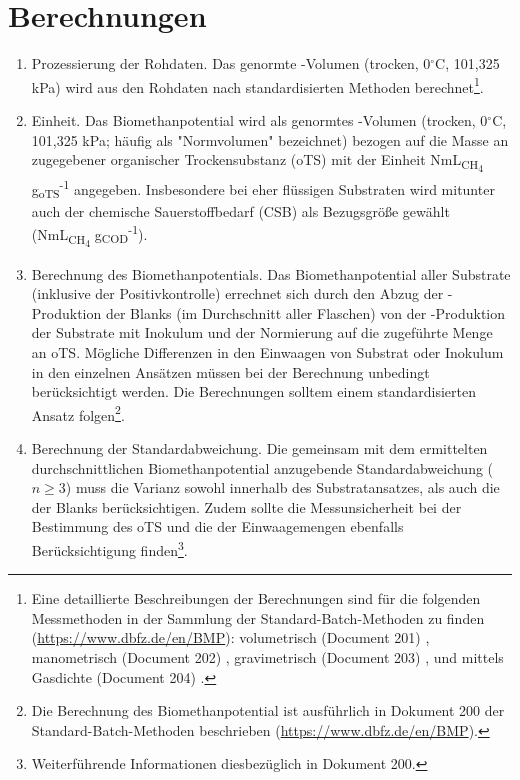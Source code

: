 \documentclass[]{article}
\begin{document}
\section{Berechnungen}
\label{sec:calculations}
\begin{enumerate}
  \item Prozessierung der Rohdaten.
    Das genormte -Volumen (trocken, 0$^\circ$C, 101,325 kPa) wird aus den Rohdaten nach standardisierten Methoden berechnet\footnote{
      Eine detaillierte Beschreibungen der Berechnungen sind für die folgenden Messmethoden in der Sammlung der Standard-Batch-Methoden zu finden (\url{https://www.dbfz.de/en/BMP}): volumetrisch (Document 201) \citep{BMPdoc201vol}, manometrisch (Document 202) \citep{BMPdoc202man}, gravimetrisch (Document 203) \citep{BMPdoc203grav}, und mittels Gasdichte (Document 204) \citep{BMPdoc204gasdens}.
    }.
  \item Einheit.
	  Das Biomethanpotential wird als genormtes -Volumen (trocken, 0$^\circ$C, 101,325 kPa; häufig als "Normvolumen" bezeichnet) bezogen auf die Masse an zugegebener organischer Trockensubstanz (oTS) mit der Einheit NmL\textsubscript{CH\textsubscript{4}} g\textsubscript{oTS}\textsuperscript{-1} angegeben. Insbesondere bei eher flüssigen Substraten wird mitunter auch der chemische Sauerstoffbedarf (CSB) als Bezugsgröße gewählt (NmL\textsubscript{CH\textsubscript{4}} g\textsubscript{COD}\textsuperscript{-1}).
  \item Berechnung des Biomethanpotentials.
    Das Biomethanpotential aller Substrate (inklusive der Positivkontrolle) errechnet sich durch den Abzug der -Produktion der Blanks (im Durchschnitt aller Flaschen) von der -Produktion der Substrate mit Inokulum und der Normierung auf die zugeführte Menge an oTS.
    Mögliche Differenzen in den Einwaagen von Substrat oder Inokulum in den einzelnen Ansätzen müssen bei der Berechnung unbedingt berücksichtigt werden.
    Die Berechnungen solltem einem standardisierten Ansatz folgen\footnote{
      Die Berechnung des Biomethanpotential ist ausführlich in Dokument 200 der Standard-Batch-Methoden beschrieben (\url{https://www.dbfz.de/en/BMP}).
    }.
  \item Berechnung der Standardabweichung.
    Die gemeinsam mit dem ermittelten durchschnittlichen Biomethanpotential anzugebende Standardabweichung ($n \ge 3$) muss die Varianz sowohl innerhalb des Substratansatzes, als auch die der Blanks berücksichtigen. Zudem sollte die Messunsicherheit bei der Bestimmung des oTS und die der Einwaagemengen ebenfalls Berücksichtigung finden\footnote{
      Weiterführende Informationen diesbezüglich in Dokument 200. 
    }.
\end{enumerate}
\end{document}
